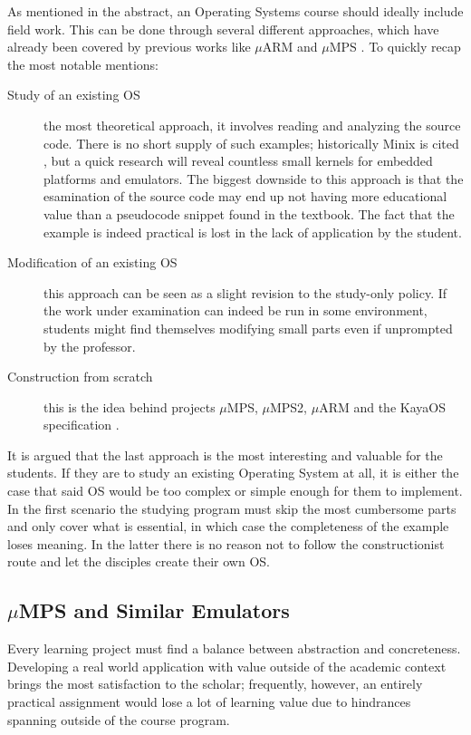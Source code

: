\documentclass[12pt,a4paper,openright,twoside]{report}
\begin{document}
As mentioned in the abstract, an Operating Systems course should ideally include
field work. This can be done through several different approaches, which
have already been covered by previous works like $\mu$ARM and $\mu$MPS
\cite{tesijonjic} \cite{tesimelletti}.
To quickly recap the most notable mentions:
\begin{description}
    \item[Study of an existing OS] the most theoretical approach, it involves
        reading and analyzing the source code. There is no short supply of such
        examples; historically Minix is cited \cite{minix}, but a quick research
        will reveal countless small kernels for embedded platforms and emulators.
        The biggest downside to this approach is that the esamination of the source
        code may end up not having more educational value than a pseudocode snippet
        found in the textbook. The fact that the example is indeed practical is 
        lost in the lack of application by the student.
    \item[Modification of an existing OS] this approach can be seen as a slight
        revision to the study-only policy. If the work under examination can indeed
        be run in some environment, students might find themselves modifying small
        parts even if unprompted by the professor.
    \item[Construction from scratch] this is the idea behind projects $\mu$MPS, 
        $\mu$MPS2, $\mu$ARM and the KayaOS specification \cite{davolimorsiani}.
\end{description}

It is argued that the last approach is the most interesting and valuable for 
the students. If they are to study an existing Operating System at all, it is
either the case that said OS would be too complex or simple enough for them 
to implement. In the first scenario the studying program must skip the most cumbersome
parts and only cover what is essential, in which case the completeness 
of the example loses meaning. In the latter there is no reason not to follow 
the constructionist route and let the disciples create their own OS.

\subsection{$\mu$MPS and Similar Emulators}
Every learning project must find a balance between abstraction and concreteness.
Developing a real world application with value outside of the academic context
 brings the most satisfaction to the scholar; frequently, however, an entirely
 practical assignment would lose a lot of learning value due to hindrances
 spanning outside of the course program.
 
\end{document}
